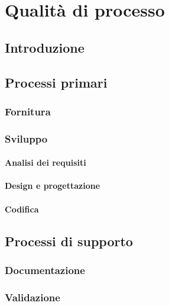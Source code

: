 \chapter{Qualità di processo}\label{qualita-di-processo}

\section{Introduzione}

\section{Processi primari}

\subsection{Fornitura}

\subsection{Sviluppo}

\subsubsection{Analisi dei requisiti}

\subsubsection{Design e progettazione}

\subsubsection{Codifica}

\section{Processi di supporto}

\subsection{Documentazione}

\subsection{Validazione}